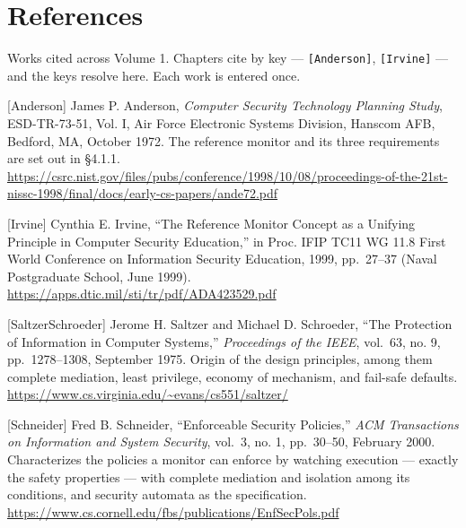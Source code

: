 \hypertarget{references}{%
\chapter{References}\label{references}}

Works cited across Volume 1. Chapters cite by key ---
\texttt{{[}Anderson{]}}, \texttt{{[}Irvine{]}} --- and the keys resolve
here. Each work is entered once.

{[}Anderson{]} James P. Anderson, \emph{Computer Security Technology
Planning Study}, ESD-TR-73-51, Vol. I, Air Force Electronic Systems
Division, Hanscom AFB, Bedford, MA, October 1972. The reference monitor
and its three requirements are set out in §4.1.1.
\url{https://csrc.nist.gov/files/pubs/conference/1998/10/08/proceedings-of-the-21st-nissc-1998/final/docs/early-cs-papers/ande72.pdf}

{[}Irvine{]} Cynthia E. Irvine, ``The Reference Monitor Concept as a
Unifying Principle in Computer Security Education,'' in Proc. IFIP TC11
WG 11.8 First World Conference on Information Security Education, 1999,
pp.~27--37 (Naval Postgraduate School, June 1999).
\url{https://apps.dtic.mil/sti/tr/pdf/ADA423529.pdf}

{[}SaltzerSchroeder{]} Jerome H. Saltzer and Michael D. Schroeder, ``The
Protection of Information in Computer Systems,'' \emph{Proceedings of
the IEEE}, vol.~63, no. 9, pp.~1278--1308, September 1975. Origin of the
design principles, among them complete mediation, least privilege,
economy of mechanism, and fail-safe defaults.
\url{https://www.cs.virginia.edu/~evans/cs551/saltzer/}

{[}Schneider{]} Fred B. Schneider, ``Enforceable Security Policies,''
\emph{ACM Transactions on Information and System Security}, vol.~3, no.
1, pp.~30--50, February 2000. Characterizes the policies a monitor can
enforce by watching execution --- exactly the safety properties --- with
complete mediation and isolation among its conditions, and security
automata as the specification.
\url{https://www.cs.cornell.edu/fbs/publications/EnfSecPols.pdf}

